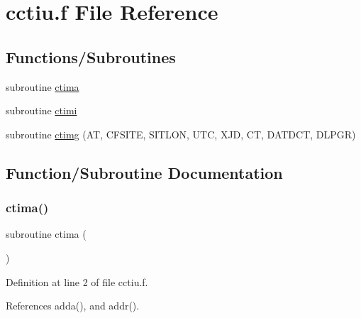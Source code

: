 \hypertarget{cctiu_8f}{}\section{cctiu.\+f File Reference}
\label{cctiu_8f}
\subsection*{Functions/\+Subroutines}
\begin{DoxyCompactItemize}
\item 
subroutine \hyperlink{cctiu_8f_a47aed21c9fa8b2181b6225531d14ab35}{ctima}
\item 
subroutine \hyperlink{cctiu_8f_aad18542389a42ccfe6498ba89b8da10a}{ctimi}
\item 
subroutine \hyperlink{cctiu_8f_af5101ec527ad11b898b9c0e7f40a0c8b}{ctimg} (AT, C\+F\+S\+I\+TE, S\+I\+T\+L\+ON, U\+TC, X\+JD, CT, D\+A\+T\+D\+CT, D\+L\+P\+GR)
\end{DoxyCompactItemize}


\subsection{Function/\+Subroutine Documentation}
\mbox{\label{cctiu_8f_a47aed21c9fa8b2181b6225531d14ab35}} 
\subsubsection{\texorpdfstring{ctima()}{ctima()}}
{\footnotesize\ttfamily subroutine ctima (\begin{DoxyParamCaption}{ }\end{DoxyParamCaption})}



Definition at line 2 of file cctiu.\+f.



References adda(), and addr().

\mbox{\label{cctiu_8f_af5101ec527ad11b898b9c0e7f40a0c8b}} 
